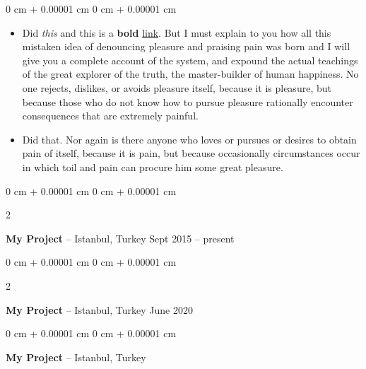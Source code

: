 \documentclass[10pt, letterpaper]{article}
\newenvironment{highlights}{
    \begin{itemize}[
        topsep=0.10 cm,
        parsep=0.10 cm,
        partopsep=0pt,
        itemsep=0pt,
        leftmargin=0 cm + 10pt
    ]
}{
    \end{itemize}
} %
\newenvironment{onecolentry}{
    \begin{adjustwidth}{
        0 cm + 0.00001 cm
    }{
        0 cm + 0.00001 cm
    }
}{
    \end{adjustwidth}
} %
\newenvironment{twocolentry}[2][]{
    \onecolentry
    \def\secondColumn{#2}
    \setcolumnwidth{\fill, 4.5 cm}
    \begin{paracol}{2}
}{
    \switchcolumn \raggedleft \secondColumn
    \end{paracol}
    \endonecolentry
} %
\begin{document}
        \vspace{0.10 cm}
        \begin{onecolentry}
            \begin{highlights}
                \item Did \textit{this} and this is a \textbf{bold} \href{https://example.com}{link}. But I must explain to you how all this mistaken idea of denouncing pleasure and praising pain was born and I will give you a complete account of the system, and expound the actual teachings of the great explorer of the truth, the master-builder of human happiness. No one rejects, dislikes, or avoids pleasure itself, because it is pleasure, but because those who do not know how to pursue pleasure rationally encounter consequences that are extremely painful.
                \item Did that. Nor again is there anyone who loves or pursues or desires to obtain pain of itself, because it is pain, but because occasionally circumstances occur in which toil and pain can procure him some great pleasure.
            \end{highlights}
        \end{onecolentry}


        \vspace{0.2 cm}

        \begin{twocolentry}{
            Sept 2015 – present
        }
            \textbf{My Project} -- Istanbul, Turkey\end{twocolentry}



        \vspace{0.2 cm}

        \begin{twocolentry}{
            June 2020
        }
            \textbf{My Project} -- Istanbul, Turkey\end{twocolentry}



        \vspace{0.2 cm}

        \begin{onecolentry}
            \textbf{My Project} -- Istanbul, Turkey\end{onecolentry}
\end{document}
